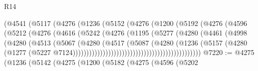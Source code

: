 \begin{lexlean}{R14}
\begin{coremodule}
                                  (@4541
                                    (@5117
                                      (@4276
                                        (@1236
                                          (@5152
                                            (@4276
                                              (@1200
                                                (@5192
                                                  (@4276
                                                    (@4596
                                                      (@5212
                                                        (@4276
                                                          (@4616
                                                            (@5242
                                                              (@4276
                                                                (@1195
                                                                  (@5277
                                                                    (@4280
                                                                      (@4461
                                                                        (@4998
                                                                          (@4280
                                                                            (@4513
                                                                              (@5067
                                                                                (@4280
                                                                                  (@4517
                                                                                    (@5087
                                                                                      (@4280
                                                                                        (@1236
                                                                                          (@5157
                                                                                            (@4280
                                                                                              (@1277
                                                                                                (@5227
                                                                                                  @7124)))))))))))))))))))))))))))))))))))))))))))))))
@7220 := @4275
    (@1236
      (@5142
        (@4275
          (@1200
            (@5182
              (@4275
                (@4596
                  (@5202

\end{coremodule}
\end{lexlean}
